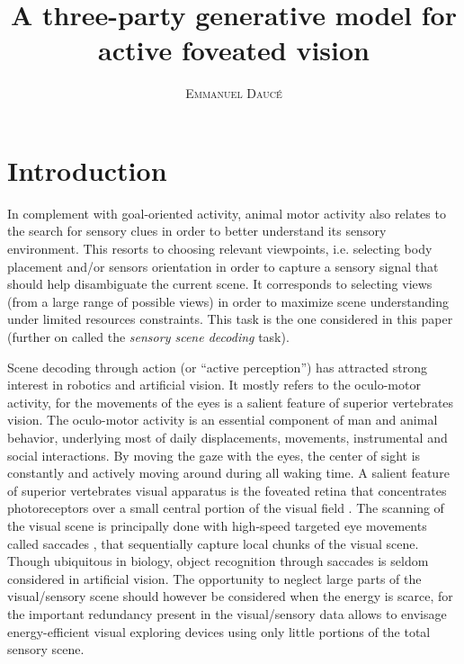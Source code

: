 \documentclass[12pt,twoside,openright]{article}
\title{\textbf{A three-party generative model for active foveated vision} }
\author{\textsc{Emmanuel Daucé}}%
\date{}
\begin{document}
	
\maketitle


	
\section{Introduction}

In complement with goal-oriented activity, animal motor activity also relates to the search for sensory clues in order to better understand its sensory environment. This resorts to choosing relevant viewpoints, i.e. selecting body placement and/or sensors orientation in order to capture a sensory signal that should help disambiguate the current scene. It corresponds to selecting views (from a large range of possible views) in order to maximize scene understanding under limited resources constraints. This task is the one considered in this paper (further on called the \emph{sensory scene decoding} task). 



Scene decoding through action (or ``active perception'') has attracted strong interest in robotics and artificial vision.  
It mostly refers to the oculo-motor activity, for the movements of the eyes is a salient feature of superior vertebrates vision. The oculo-motor activity is an essential component of man and animal behavior, underlying most of daily displacements, movements, instrumental and social interactions. By moving the gaze with the eyes, the center of sight is constantly and actively moving around during all waking time. 
A salient feature of superior vertebrates visual apparatus is the foveated retina that concentrates  photoreceptors over a small central portion of the visual field \cite{osterberg1935topography}. The scanning of the visual scene is principally done with high-speed targeted eye movements called saccades \cite{yarbus1967eye}, that sequentially capture local chunks of the visual scene. 
Though ubiquitous in biology, object recognition through saccades is seldom considered in artificial vision. 
The opportunity to neglect large parts of the {\color{blue} visual/sensory} scene should however be considered when the energy is scarce, for the important redundancy present in the {\color{blue} visual/sensory} data allows to envisage energy-efficient visual exploring devices  
using only little portions of the total sensory scene.
\end{document}
